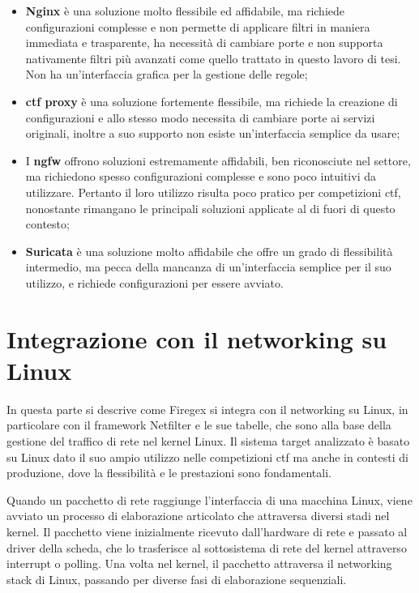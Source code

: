 \begin{itemize}
    \setlength{\itemsep}{1pt}
    \setlength{\parskip}{1pt}
    \item \textbf{Nginx} è una soluzione molto flessibile ed affidabile, ma richiede configurazioni complesse e non permette di applicare filtri in maniera immediata e trasparente, ha necessità di cambiare porte e non supporta nativamente filtri più avanzati come quello trattato in questo lavoro di tesi. Non ha un'interfaccia grafica per la gestione delle regole;
    \item \textbf{\gls{ctf} proxy} è una soluzione fortemente flessibile, ma richiede la creazione di configurazioni e allo stesso modo necessita di cambiare porte ai servizi originali, inoltre a suo supporto non esiste un'interfaccia semplice da usare;
    \item I \textbf{\gls{ngfw}} offrono soluzioni estremamente affidabili, ben riconosciute nel settore, ma richiedono spesso configurazioni complesse e sono poco intuitivi da utilizzare. Pertanto il loro utilizzo risulta poco pratico per competizioni \gls{ctf}, nonostante rimangano le principali soluzioni applicate al di fuori di questo contesto;
    \item \textbf{Suricata} è una soluzione molto affidabile che offre un grado di flessibilità intermedio, ma pecca della mancanza di un'interfaccia semplice per il suo utilizzo, e richiede configurazioni per essere avviato.
\end{itemize}

\section{Integrazione con il networking su Linux}

In questa parte si descrive come Firegex si integra con il networking su Linux, in particolare con il framework Netfilter e le sue tabelle, che sono alla base della gestione del traffico di rete nel kernel Linux.
Il sistema target analizzato è basato su Linux dato il suo ampio utilizzo nelle competizioni \gls{ctf} ma anche in contesti di produzione, dove la flessibilità e le prestazioni sono fondamentali.

Quando un pacchetto di rete raggiunge l'interfaccia di una macchina Linux, viene avviato un processo di elaborazione articolato che attraversa diversi stadi nel kernel. Il pacchetto viene inizialmente ricevuto dall'hardware di rete e passato al driver della scheda, che lo trasferisce al sottosistema di rete del kernel attraverso interrupt o polling. Una volta nel kernel, il pacchetto attraversa il networking stack di Linux, passando per diverse fasi di elaborazione sequenziali.

